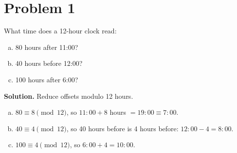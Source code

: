 \section*{Problem 1}

What time does a 12-hour clock read:

\begin{enumerate}[(a)]
\item 80 hours after 11{:}00?
\item 40 hours before 12{:}00?
\item 100 hours after 6{:}00?
\end{enumerate}

\textbf{Solution.} Reduce offsets modulo 12 hours.

\begin{enumerate}[(a)]
\item $80 \equiv 8 \pmod{12}$, so $11{:}00+8$ hours $=19{:}00\equiv \boxed{7{:}00}$.
\item $40 \equiv 4 \pmod{12}$, so 40 hours before is 4 hours before: $12{:}00-4=\boxed{8{:}00}$.
\item $100 \equiv 4 \pmod{12}$, so $6{:}00+4=\boxed{10{:}00}$.
\end{enumerate}
